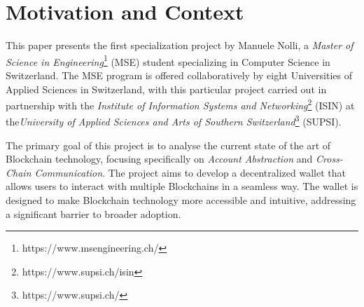 \chapter{Motivation and Context}
\label{chap:motivation_and_context}

This paper presents the first specialization project by Manuele Nolli, a \textit{Master of Science in Engineering}\footnote{https://www.msengineering.ch/} (MSE) student specializing in Computer Science in Switzerland. The MSE program is offered collaboratively by eight Universities of Applied Sciences in Switzerland, with this particular project carried out in partnership with the \textit{Institute of Information Systems and Networking}\footnote{https://www.supsi.ch/isin} (ISIN) at the\textit{University of Applied Sciences and Arts of Southern Switzerland}\footnote{https://www.supsi.ch/} (SUPSI).

The primary goal of this project is to analyse the current state of the art of Blockchain technology, focusing specifically on \textit{Account Abstraction} and \textit{Cross-Chain Communication}. The project aims to develop a decentralized wallet that allows users to interact with multiple Blockchains in a seamless way. The wallet is designed to make Blockchain technology more accessible and intuitive, addressing a significant barrier to broader adoption.